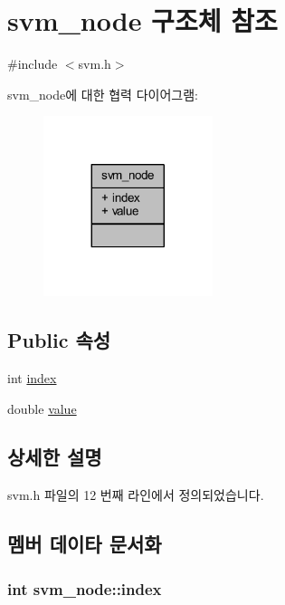 \hypertarget{structsvm__node}{\section{svm\+\_\+node 구조체 참조}
\label{structsvm__node}
}


{\ttfamily \#include $<$svm.\+h$>$}



svm\+\_\+node에 대한 협력 다이어그램\+:
\nopagebreak
\begin{figure}[H]
\begin{center}
\leavevmode
\includegraphics[width=140pt]{structsvm__node__coll__graph}
\end{center}
\end{figure}
\subsection*{Public 속성}
\begin{DoxyCompactItemize}
\item 
int \hyperlink{structsvm__node_aa733ca75ee5a5c0f36af5ddb4c6394d9}{index}
\item 
double \hyperlink{structsvm__node_a9ca47b8a156238d04213453f3b89e177}{value}
\end{DoxyCompactItemize}


\subsection{상세한 설명}


svm.\+h 파일의 12 번째 라인에서 정의되었습니다.



\subsection{멤버 데이타 문서화}
\hypertarget{structsvm__node_aa733ca75ee5a5c0f36af5ddb4c6394d9}{
\subsubsection[{index}]{\setlength{\rightskip}{0pt plus 5cm}int svm\+\_\+node\+::index}}\label{structsvm__node_aa733ca75ee5a5c0f36af5ddb4c6394d9}


